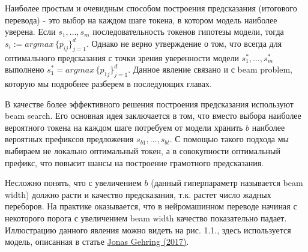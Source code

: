 \documentclass[a4paper,12pt]{article} %
\newcommand{\bibref}[3]{\hyperlink{#1}{#2 (#3)}} %
\begin{document}
	Наиболее простым и очевидным способом построения предсказания (итогового перевода) - это выбор на каждом шаге токена, в котором модель наиболее уверена. Если $s_1, \dots, s_m$ последовательность токенов гипотезы модели, тогда $s_i := argmax \, \{p_{ij}\}_{j=1}^{d}$. Однако не верно утверждение о том, что всегда для оптимального предсказания с точки зрения уверенности модели $s_1^*, \dots, s_m^*$ выполнено $s_1^* = argmax \, \{p_{1j}\}_{j=1}^{d}$. Данное явление связано и с beam problem, которую мы подробнее разберем в последующих главах.
	
	В качестве более эффективного решения построения предсказания используют beam search. Его основная идея заключается в том, что вместо выбора наиболее вероятного токена на каждом шаге потребуем от модели хранить $b$ наиболее вероятных префиксов предложения $s_{b1}, \dots, s_{bt}$. С помощью такого подхода мы выбираем не локально оптимальный токен, а в совокупности оптимальный префикс, что повысит шансы на построение грамотного предсказания. 
	
	Несложно понять, что с увеличением $b$ (данный гиперпараметр называется beam width) должно расти и качество предсказания, т.к. растет число жадных переборов. На практике оказывается, что в нейромашинном переводе начиная с некоторого порога с увеличением beam width качество показательно падает. Иллюстрацию данного явления можно видеть на рис. 1.1., здесь используется модель, описанная в статье \bibref{fconv}{Jonas Gehring}{2017}. 
	
	
	\begin{figure}[t]
	\end{figure}
	
\end{document}
